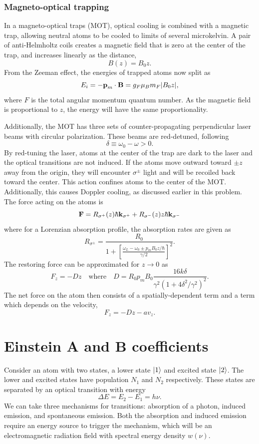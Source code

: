 \documentclass{homework}
\begin{document}
	\subsubsection*{Magneto-optical trapping}
	In a magneto-optical traps (MOT), optical cooling is combined with a magnetic trap, allowing neutral atoms to be cooled to limits of several microkelvin. A pair of anti-Helmholtz coils creates a magnetic field that is zero at the center of the trap, and increases linearly as the distance, $$B(z) = B_0 z.$$
	From the Zeeman effect, the energies of trapped atoms now split as $$E_i = - \boldsymbol{\mathrm{p}}_m \cdot \boldsymbol{\mathrm{B}} = g_F \mu_B m_F \abs{B_0 z},$$
	where $F$ is the total angular momentum quantum number. As the magnetic field is proportional to $z$, the energy will have the same proportionality.
	
	Additionally, the MOT has three sets of counter-propagating perpendicular laser beams with circular polarization. These beams are red-detuned, following 
		$$\delta \equiv \omega_0 - \omega > 0.$$
	By red-tuning the laser, atoms at the center of the trap are dark to the laser and the optical transitions are not induced. If the atoms move outward toward $\pm z$ away from the origin, they will encounter $\sigma^\pm$ light and will be recoiled back toward the center. This action confines atoms to the center of the MOT.  Additionally, this causes Doppler cooling, as discussed earlier in this problem. The force acting on the atoms is $$\boldsymbol{\mathrm{F}} = R_{\sigma^+}(z) \hbar \boldsymbol{\mathrm{k}}_{\sigma^+} + R_{\sigma^-}(z)z \hbar \boldsymbol{\mathrm{k}}_{\sigma^-}$$
	where for a Lorenzian absorption profile, the absorption rates are given as
	$$R_{\sigma^\pm} = \frac{R_0}{1 + \left[\frac{\omega_L - \omega_0 \pm p_m B_0 z / \hbar}{\gamma / 2}\right]^2}.$$
	The restoring force can be approximated for $z \to 0$ as 
	$$
		F_z = - D z \quad \text{where} \quad D = R_0 p_m B_0 \frac{16 k \delta}{\gamma^2(1 + 4 \delta^2 / \gamma^2)^2}.
	$$
	The net force on the atom then consists of a spatially-dependent term and a term which depends on the velocity,
	$$F_z = - D z - a v_z.$$
	\pagebreak
	
	\section{Einstein A and B coefficients}
	Consider an atom with two states, a lower state $\ket{1}$ and excited state $\ket{2}$. The lower and excited states have population $N_1$ and $N_2$ respectively. These states are separated by an optical transition with energy
	$$\Delta E = E_2 - E_1 = h \nu.$$
	We can take three mechanisms for transitions: absorption of a photon, induced emission, and spontaneous emission. Both the absorption and induced emission require an energy source to trigger the mechanism, which will be an electromagnetic radiation field with spectral energy density $w(\nu)$.
	
\end{document}
